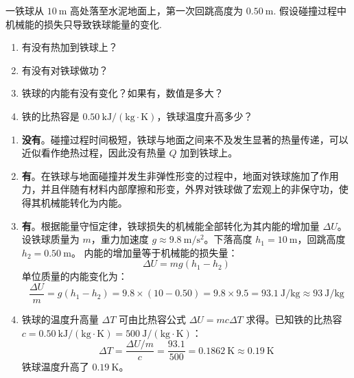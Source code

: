 \begin{exercise}\label{ex:11.1}
一铁球从 $10 \ \mathrm{m}$ 高处落至水泥地面上，第一次回跳高度为 $0.50 \ \mathrm{m}$. 假设碰撞过程中机械能的损失只导致铁球能量的变化. 
\begin{enumerate}
  \item[(a)] 有没有热加到铁球上？
  \item[(b)] 有没有对铁球做功？
  \item[(c)] 铁球的内能有没有变化？如果有，数值是多大？
  \item[(d)] 铁的比热容是 $0.50 \ \mathrm{kJ/(kg \cdot K)}$，铁球温度升高多少？
\end{enumerate}
\end{exercise}
\begin{solution}
\begin{enumerate}
    \item[(a)] \textbf{没有}。碰撞过程时间极短，铁球与地面之间来不及发生显著的热量传递，可以近似看作绝热过程，因此没有热量 $Q$ 加到铁球上。
    \item[(b)] \textbf{有}。在铁球与地面碰撞并发生非弹性形变的过程中，地面对铁球施加了作用力，并且伴随有材料内部摩擦和形变，外界对铁球做了宏观上的非保守功，使得其机械能转化为内能。
    \item[(c)] \textbf{有}。根据能量守恒定律，铁球损失的机械能全部转化为其内能的增加量 $\Delta U$。
    设铁球质量为 $m$，重力加速度 $g \approx 9.8 \ \mathrm{m/s^2}$。下落高度 $h_1 = 10 \ \mathrm{m}$，回跳高度 $h_2 = 0.50 \ \mathrm{m}$。
    内能的增加量等于机械能的损失量：
    $$ \Delta U = mg(h_1 - h_2) $$
    单位质量的内能变化为：
    $$ \frac{\Delta U}{m} = g(h_1 - h_2) = 9.8 \times (10 - 0.50) = 9.8 \times 9.5 = 93.1 \ \mathrm{J/kg} \approx 93 \ \mathrm{J/kg} $$
    \item[(d)] 铁球的温度升高量 $\Delta T$ 可由比热容公式 $\Delta U = mc \Delta T$ 求得。已知铁的比热容 $c = 0.50 \ \mathrm{kJ/(kg \cdot K)} = 500 \ \mathrm{J/(kg \cdot K)}$：
    $$ \Delta T = \frac{\Delta U / m}{c} = \frac{93.1}{500} = 0.1862 \ \mathrm{K} \approx 0.19 \ \mathrm{K} $$
    铁球温度升高了 $0.19 \ \mathrm{K}$。
\end{enumerate}
\end{solution}

